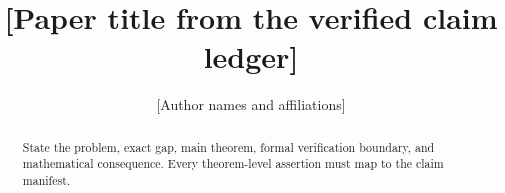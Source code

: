 \documentclass[11pt]{article}
\title{[Paper title from the verified claim ledger]}
\author{[Author names and affiliations]}
\date{}
\theoremstyle{definition}
\theoremstyle{remark}
\begin{document}
\maketitle
\begin{abstract}
State the problem, exact gap, main theorem, formal verification boundary, and mathematical consequence. Every theorem-level assertion must map to the claim manifest.
\end{abstract}











\end{document}
